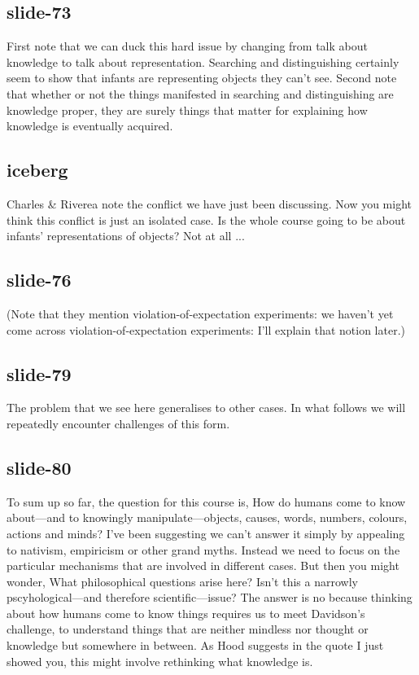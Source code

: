 \documentclass[12pt,\papersize]{extarticle}
\begin{document}
 
\subsection{slide-73}
First note that we can duck this hard issue by changing from talk about knowledge to talk about representation.
Searching and distinguishing certainly seem to show that infants are representing objects they can't see.
Second note that whether or not the things manifested in searching and distinguishing are knowledge proper, they are surely things that matter for explaining how knowledge is eventually acquired.
 
 
\subsection{iceberg}
Charles \& Riverea note the conflict we have just been discussing.
Now you might think this conflict is just an isolated case.
Is the whole course going to be about infants' representations of objects? Not at all ...
 
 
\subsection{slide-76}
(Note that they mention violation-of-expectation experiments: we haven't yet come across violation-of-expectation experiments: I'll explain that notion later.)
 
 
\subsection{slide-79}
The problem that we see here generalises to other cases.
In what follows we will repeatedly encounter challenges of this form.
 
 
\subsection{slide-80}
To sum up so far, the question for this course is, How do humans come to know about---and to knowingly manipulate---objects, causes, words, numbers, colours, actions and minds?
I've been suggesting we can't answer it simply by appealing to nativism, empiricism or other grand myths.
Instead we need to focus on the particular mechanisms that are involved in different cases.
But then you might wonder, What philosophical questions arise here? Isn't this a narrowly pscyhological---and therefore scientific---issue?
The answer is no because thinking about how humans come to know things requires us to meet Davidson's challenge, to understand things that are neither mindless nor thought or knowledge but somewhere in between.
As Hood suggests in the quote I just showed you, this might involve rethinking what knowledge is.
 
\end{document}
